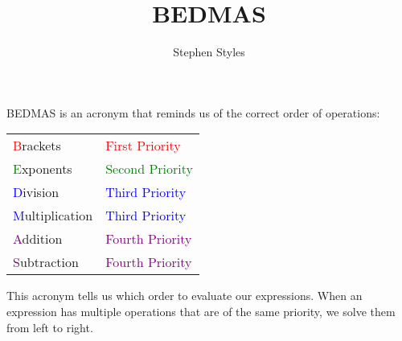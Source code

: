 \documentclass[16pt]{article}
\title{BEDMAS}
\author{Stephen Styles}
\theoremstyle{remark}
\begin{document}
\maketitle
\vspace*{-0.1cm}
BEDMAS is an acronym that reminds us of the correct order of operations:\\
\begin{center}
\begin{tabular}{ l l }
 \textcolor{red}{B}rackets & \textcolor{red}{First Priority}  \\ 
 \textcolor{green}{E}xponents & \textcolor{green}{Second Priority } \\  
 \textcolor{blue}{D}ivision & \textcolor{blue}{Third Priority}  \\
 \textcolor{blue}{M}ultiplication & \textcolor{blue}{Third Priority}\\
 \textcolor{purple}{A}ddition & \textcolor{purple}{Fourth Priority}\\
 \textcolor{purple}{S}ubtraction & \textcolor{purple}{Fourth Priority}\\    
\end{tabular}
\end{center}
This acronym tells us which order to evaluate our expressions. When an expression has multiple operations that are of the same priority, we solve them from left to right.\\
\end{document}
